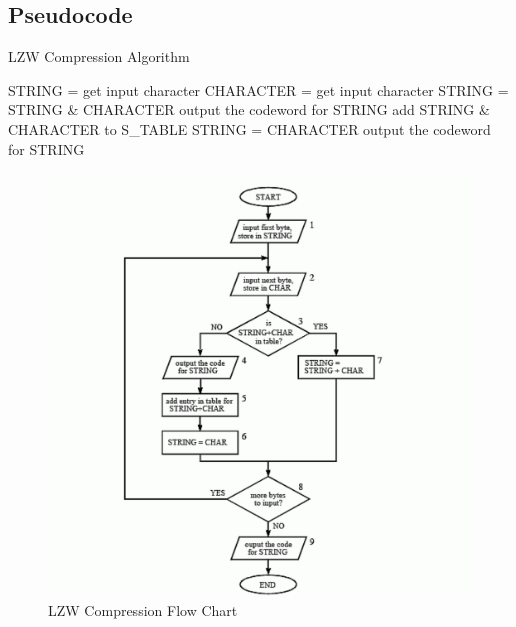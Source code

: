 \documentclass[12pt, a4paper]{article}
\begin{document}
 \subsection{Pseudocode}
 \begin{algorithm}
\caption{LZW Compression Algorithm}
\begin{algorithmic}[1]
\State STRING = get input character
    \State CHARACTER = get input character
        \State STRING = STRING \& CHARACTER
    \Else
        \State output the codeword for STRING
        \State add STRING \& CHARACTER to S\_TABLE
        \State STRING = CHARACTER
    \EndIf
\EndWhile
\State output the codeword for STRING
\EndProcedure
\end{algorithmic}
\end{algorithm}
 \begin{figure}
    \centering
    \includegraphics{images/compression.png}
    \caption{LZW Compression Flow Chart}
    \label{fig:enter-label}
\end{figure}
 \cite{smith1997scientist}
 \newpage
\end{document}
